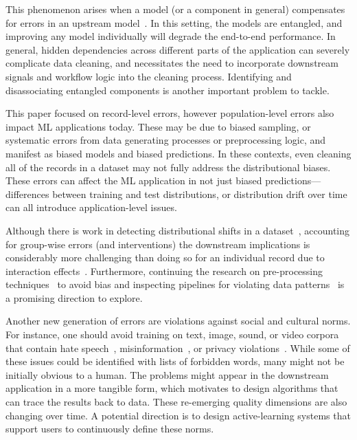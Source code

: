 \documentclass[11pt,dvipsnames]{article}
\begin{document}
 This phenomenon arises when a model (or a component in general) compensates for errors in an upstream model~\cite{SoftwareEngineering4ML,HiddenTechnicalDebt}.   In this setting, the models are entangled, and improving any model individually will degrade the end-to-end performance.  In general, hidden dependencies across different parts of the application can severely complicate data cleaning, and necessitates the need to incorporate downstream signals and workflow logic into the cleaning process.   Identifying and disassociating entangled components is another important problem to tackle. 

  This paper focused on record-level errors, however population-level errors also impact ML applications today.  These may be due to biased sampling, or systematic errors from data generating processes or preprocessing logic, and manifest as biased models and biased predictions.  In these contexts, even cleaning all of the records in a dataset may not fully address the distributional biases.  These errors can affect the ML application in not just biased predictions---differences between training and test distributions, or distribution drift over time can all introduce application-level issues.  

Although there is work in detecting distributional shifts in a dataset~\cite{lipton2018detecting,abdelkader2020towards}, accounting for group-wise errors (and interventions) the downstream implications is considerably more challenging than doing so for an individual record due to interaction effects~\cite{Koh2019OnTA}. Furthermore, continuing the research on pre-processing techniques~\cite{InterventionalFairness} to avoid bias and inspecting pipelines for violating data patterns~\cite{Grafbergercidr2021} is a promising direction to explore.

 Another new generation of errors are violations against social and cultural norms. For instance, one should avoid training on text, image, sound, or video corpora that contain hate speech~\cite{Tay}, misinformation~\cite{Scrutinizer}, or privacy violations~\cite{ExtractingTrainingDatafromLanguageModels, Amnesia}. While some of these issues could be identified with lists of forbidden words, many might not be initially obvious to a human. The problems might appear in the downstream application in a more tangible form, which motivates to design algorithms that can trace the results back to data. These re-emerging quality dimensions are also changing over time. A potential direction is to design active-learning systems that support users to continuously define these norms.
\end{document}
